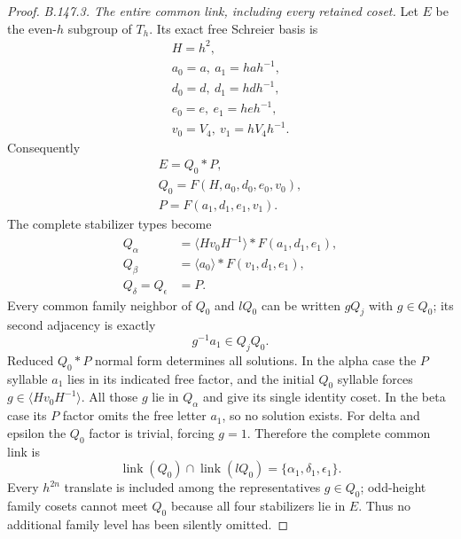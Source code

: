 \begin{proof}
\emph{B.147.3. The entire common link, including every retained coset.}
Let $E$ be the even-$h$ subgroup of $T_h$. Its exact free Schreier
basis is
\[
\begin{gathered}
 H=h^2, \\
 a_0=a,\ a_1=hah^{-1}, \\
 d_0=d,\ d_1=hdh^{-1}, \\
 e_0=e,\ e_1=heh^{-1}, \\
 v_0=V_4,\ v_1=hV_4h^{-1}.
\end{gathered}
\]
Consequently
\begin{equation}\label{eq:B147-free-factors}
\begin{gathered}
 E=Q_0*P, \\
 Q_0=F(H,a_0,d_0,e_0,v_0), \\
 P=F(a_1,d_1,e_1,v_1).
\end{gathered}
\end{equation}
The complete stabilizer types become
\begin{equation}\label{eq:B147-stabilizer-products}
\begin{aligned}
 Q_\alpha&=\langle Hv_0H^{-1}\rangle*F(a_1,d_1,e_1),\\
 Q_\beta&=\langle a_0\rangle*F(v_1,d_1,e_1),\\
 Q_\delta=Q_\epsilon&=P.
\end{aligned}
\end{equation}
Every common family neighbor of $Q_0$ and $lQ_0$ can be written
$gQ_j$ with $g\in Q_0$; its second adjacency is exactly
\begin{equation}\label{eq:B147-coset-condition}
 g^{-1}a_1\in Q_jQ_0.
\end{equation}
Reduced $Q_0*P$ normal form determines all solutions. In the
alpha case the $P$ syllable $a_1$ lies in its indicated free
factor, and the initial $Q_0$ syllable forces
$g\in\langle Hv_0H^{-1}\rangle$. All those $g$ lie in
$Q_\alpha$ and give its single identity coset. In the beta case
its $P$ factor omits the free letter $a_1$, so no solution exists.
For delta and epsilon the $Q_0$ factor is trivial, forcing $g=1$.
Therefore the complete common link is
\begin{equation}\label{eq:B147-complete-link}
 \operatorname{link}(Q_0)\cap\operatorname{link}(lQ_0)
                  =\{\alpha_1,\delta_1,\epsilon_1\}.
\end{equation}
Every $h^{2n}$ translate is included among the representatives
$g\in Q_0$; odd-height family cosets cannot meet $Q_0$ because
all four stabilizers lie in $E$. Thus no additional family level
has been silently omitted.


\end{proof}
